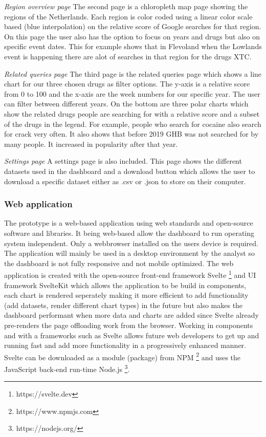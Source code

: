 \textit{Region overview page}\newline
The second page is a chloropleth map page showing the regions of the Netherlands. Each region is color coded using a linear color scale based (blue interpolation) on the relative score of Google searches for that region. On this page the user also has the option to focus on years and drugs but also on specific event dates. This for example shows that in Flevoland when the Lowlands event is happening there are alot of searches in that region for the drugs XTC.

\textit{Related queries page}\newline
The third page is the related queries page which shows a line chart for our three chosen drugs as filter options. The y-axis is a relative score from 0 to 100 and the x-axis are the week numbers for our specific year. The user can filter between different years. On the bottom are three polar charts which show the related drugs people are searching for with a relative score and a subset of the drugs in the legend. For example, people who search for cocaine also search for crack very often. It also shows that before 2019 GHB was not searched for by many people. It increased in popularity after that year.

\textit{Settings page}\newline
A settings page is also included. This page shows the different datasets used in the dashboard and a download button which allows the user to download a specific dataset either as .csv or .json to store on their computer.

\subsubsection{Web application}\hfill
The prototype is a web-based application using web standards and open-source software and libraries. It being web-based allow the dashboard to run operating system independent. Only a webbrowser installed on the users device is required. The application will mainly be used in a desktop environment by the analyst so the dashboard is not fully responsive and not mobile optimized. The web application is created with the open-source front-end framework Svelte \footnote{https://svelte.dev} and UI framework SvelteKit which allows the application to be build in components, each chart is rendered seperately making it more efficient to add functionality (add datasets, render different chart types) in the future but also makes the dashboard performant when more data and charts are added since Svelte already pre-renders the page offloading work from the browser. Working in components and with a frameworks such as Svelte allows future web developers to get up and running fast and add more functionality in a progressively enhanced manner. Svelte can be downloaded as a module (package) from NPM \footnote{https://www.npmjs.com} and uses the JavaScript back-end run-time Node.js \footnote{https://nodejs.org/}. 

